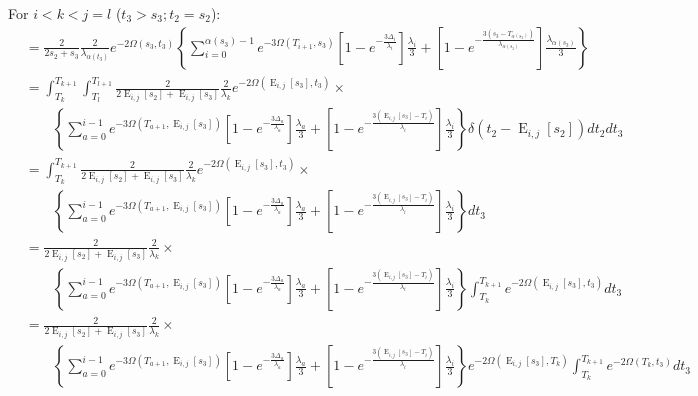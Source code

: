 \documentclass{article}
\DeclareMathOperator{\E}{E}
\begin{document}
For $i<k<j=l$ ($t_3>s_3; t_2=s_2$):
\begin{align*}
    &=\frac{2}{2s_2+s_3}\frac{2}{\lambda_{\alpha(t_3)}}e^{-2\Omega(s_3,t_3)}
    \left\{\sum_{i=0}^{\alpha(s_3)-1}e^{-3\Omega(T_{i+1},s_3)}
        \left[1-e^{-\frac{3\Delta_i}{\lambda_i}}\right]\frac{\lambda_i}{3}+
    \left[1-e^{-\frac{3\left(s_3-T_{\alpha(s_3)}\right)}{\lambda_{\alpha(s_3)}}}\right]
        \frac{\lambda_{\alpha(s_3)}}{3}\right\}\\
    &=\int_{T_k}^{T_{k+1}}\int_{T_l}^{T_{l+1}}
    \frac{2}{2\E_{i,j}[s_2]+\E_{i,j}[s_3]}\frac{2}{\lambda_{k}}e^{-2\Omega(\E_{i,j}[s_3],t_3)}\times\\
    &\qquad\left\{\sum_{a=0}^{i-1}e^{-3\Omega(T_{a+1},\E_{i,j}[s_3])}
    \left[1-e^{-\frac{3\Delta_a}{\lambda_a}}\right]\frac{\lambda_a}{3}+
    \left[1-e^{-\frac{3\left(\E_{i,j}[s_3]-T_{i}\right)}{\lambda_{i}}}\right]
    \frac{\lambda_{i}}{3}\right\}
    \delta(t_2-\E_{i,j}[s_2])dt_2dt_3\\
    &=\int_{T_k}^{T_{k+1}}
    \frac{2}{2\E_{i,j}[s_2]+\E_{i,j}[s_3]}\frac{2}{\lambda_{k}}e^{-2\Omega(\E_{i,j}[s_3],t_3)}\times\\
    &\qquad\left\{\sum_{a=0}^{i-1}e^{-3\Omega(T_{a+1},\E_{i,j}[s_3])}
    \left[1-e^{-\frac{3\Delta_a}{\lambda_a}}\right]\frac{\lambda_a}{3}+
    \left[1-e^{-\frac{3\left(\E_{i,j}[s_3]-T_{i}\right)}{\lambda_{i}}}\right]
    \frac{\lambda_{i}}{3}\right\}
    dt_3\\
    &=\frac{2}{2\E_{i,j}[s_2]+\E_{i,j}[s_3]}\frac{2}{\lambda_{k}}\times\\
    &\qquad\left\{\sum_{a=0}^{i-1}e^{-3\Omega(T_{a+1},\E_{i,j}[s_3])}
    \left[1-e^{-\frac{3\Delta_a}{\lambda_a}}\right]\frac{\lambda_a}{3}+
    \left[1-e^{-\frac{3\left(\E_{i,j}[s_3]-T_{i}\right)}{\lambda_{i}}}\right]
    \frac{\lambda_{i}}{3}\right\}
    \int_{T_k}^{T_{k+1}}e^{-2\Omega(\E_{i,j}[s_3],t_3)}dt_3\\
    &=\frac{2}{2\E_{i,j}[s_2]+\E_{i,j}[s_3]}\frac{2}{\lambda_{k}}\times\\
    &\qquad\left\{\sum_{a=0}^{i-1}e^{-3\Omega(T_{a+1},\E_{i,j}[s_3])}
    \left[1-e^{-\frac{3\Delta_a}{\lambda_a}}\right]\frac{\lambda_a}{3}+
    \left[1-e^{-\frac{3\left(\E_{i,j}[s_3]-T_{i}\right)}{\lambda_{i}}}\right]
    \frac{\lambda_{i}}{3}\right\}
    e^{-2\Omega(\E_{i,j}[s_3],T_k)}
    \int_{T_k}^{T_{k+1}}e^{-2\Omega(T_k,t_3)}dt_3\\

\end{align*}
\end{document}
